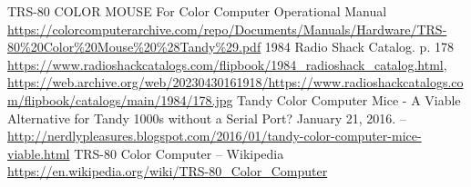 \documentclass[11pt, a4paper]{article}
\begin{document}
\begin{thebibliography}{9}
 TRS-80 COLOR MOUSE For Color Computer Operational Manual \url{https://colorcomputerarchive.com/repo/Documents/Manuals/Hardware/TRS-80%20Color%20Mouse%20%28Tandy%29.pdf}
 1984 Radio Shack Catalog. p. 178 \url{https://www.radioshackcatalogs.com/flipbook/1984_radioshack_catalog.html}, \url{https://web.archive.org/web/20230430161918/https://www.radioshackcatalogs.com/flipbook/catalogs/main/1984/178.jpg}
 Tandy Color Computer Mice - A Viable Alternative for Tandy 1000s without a Serial Port? January 21, 2016. -- \url{http://nerdlypleasures.blogspot.com/2016/01/tandy-color-computer-mice-viable.html}
 TRS-80 Color Computer -- Wikipedia \url{https://en.wikipedia.org/wiki/TRS-80_Color_Computer}
\end{thebibliography}
\end{document}
